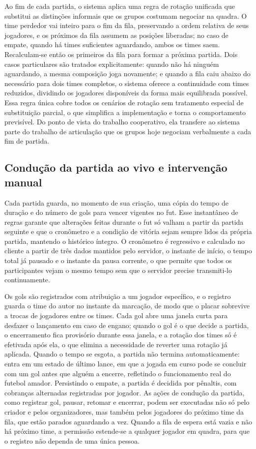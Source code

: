      Ao fim de cada partida, o sistema aplica uma regra de rotação unificada que substitui as distinções informais que os grupos costumam negociar na quadra. O time perdedor vai inteiro para o fim da fila, preservando a ordem relativa de seus jogadores, e os próximos da fila assumem as posições liberadas; no caso de empate, quando há times suficientes aguardando, ambos os times saem. Recalculam-se então os primeiros da fila para formar a próxima partida. Dois casos particulares são tratados explicitamente: quando não há ninguém aguardando, a mesma composição joga novamente; e quando a fila caiu abaixo do necessário para dois times completos, o sistema oferece a continuidade com times reduzidos, dividindo os jogadores disponíveis da forma mais equilibrada possível. Essa regra única cobre todos os cenários de rotação sem tratamento especial de substituição parcial, o que simplifica a implementação e torna o comportamento previsível. Do ponto de vista do trabalho cooperativo, ela transfere ao sistema parte do trabalho de articulação que os grupos hoje negociam verbalmente a cada fim de partida.

    \subsection{Condução da partida ao vivo e intervenção manual}
      \label{subsec:dev-partida}
      Cada partida guarda, no momento de sua criação, uma cópia do tempo de duração e do número de gols para vencer vigentes no fut. Esse instantâneo de regras garante que alterações feitas durante o fut só valham a partir da partida seguinte e que o cronômetro e a condição de vitória sejam sempre lidos da própria partida, mantendo o histórico íntegro. O cronômetro é regressivo e calculado no cliente a partir de três dados mantidos pelo servidor, o instante de início, o tempo total já pausado e o instante da pausa corrente, o que permite que todos os participantes vejam o mesmo tempo sem que o servidor precise transmiti-lo continuamente.

      Os gols são registrados com atribuição a um jogador específico, e o registro guarda o time do autor no instante da marcação, de modo que o placar sobrevive a trocas de jogadores entre os times. Cada gol abre uma janela curta para desfazer o lançamento em caso de engano; quando o gol é o que decide a partida, o encerramento fica provisório durante essa janela, e a rotação dos times só é efetivada após ela, o que elimina a necessidade de reverter uma rotação já aplicada. Quando o tempo se esgota, a partida não termina automaticamente: entra em um estado de último lance, em que a jogada em curso pode se concluir com um gol antes que alguém a encerre, refletindo o funcionamento real do futebol amador. Persistindo o empate, a partida é decidida por pênaltis, com cobranças alternadas registradas por jogador. As ações de condução da partida, como registrar gol, pausar, retomar e encerrar, podem ser executadas não só pelo criador e pelos organizadores, mas também pelos jogadores do próximo time da fila, que estão parados aguardando a vez. Quando a fila de espera está vazia e não há próximo time, a permissão estende-se a qualquer jogador em quadra, para que o registro não dependa de uma única pessoa.

